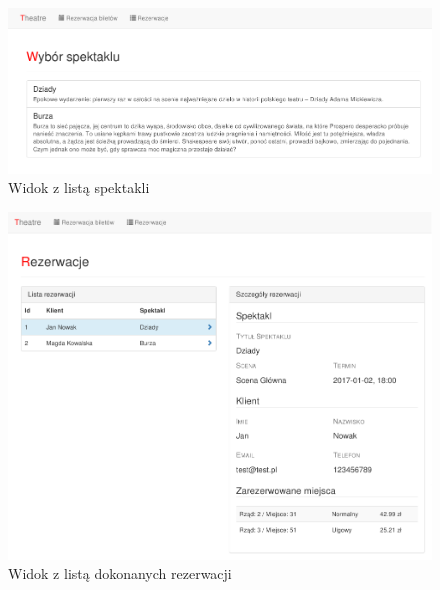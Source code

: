 \documentclass{mgr}
\begin{document}
\begin{figure}[!ht]
	\centering
	\includegraphics[width=\textwidth]{images/spectacles.png}
	\caption{Widok z listą spektakli}
	\label{fig:spectacles}
\end{figure}

\begin{figure}[!ht]
	\centering
	\includegraphics[width=\textwidth]{images/reservations.png}
	\caption{Widok z listą dokonanych rezerwacji}
	\label{fig:reservations}
\end{figure}
\end{document}
